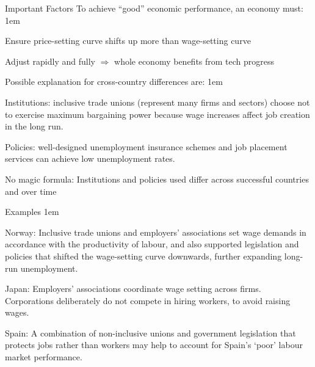 \documentclass[11pt,aspectratio=43,usenames,dvipsnames]{beamer}
\let\oldenumerate=\enumerate
\let\endoldenumerate=\endenumerate
\renewenvironment{enumerate}{\oldenumerate \itemsep1em}{ \endoldenumerate}
\theoremstyle{definition}
\begin{document}
\begin{frame}{Important Factors}
\label{slide:Important_Factors}
    To achieve ``good'' economic performance, an economy must:
    \begin{enumerate}
        \item<1-4> Ensure price-setting curve shifts up more than wage-setting curve
        \item<2-4> Adjust rapidly and fully $ \Rightarrow  $ whole economy benefits from tech progress
    \end{enumerate}

    Possible explanation for cross-country differences are:
    \begin{enumerate}
        \item<3-4>  \alert{Institutions}: inclusive trade unions (represent many firms and sectors) choose not to exercise maximum bargaining power because wage increases affect job creation in the long run.
        \item<4-4> \alert{Policies}: well-designed unemployment insurance schemes and job placement services can achieve low unemployment rates.
    \end{enumerate}

        No magic formula: Institutions and policies used differ across successful countries and over time
\end{frame}

\begin{frame}{Examples}
\label{slide:Examples}
    \begin{enumerate}
        \item<1-3> Norway: Inclusive trade unions and employers’ associations set wage
demands in accordance with the productivity of labour, and also
supported legislation and policies that shifted the wage-setting curve
downwards, further expanding long-run unemployment.
        \item<2-3>
Japan: Employers’ associations coordinate wage setting across firms.
Corporations deliberately do not compete in hiring workers, to avoid
raising wages.
\item<3-3>
Spain: A combination of non-inclusive unions and government
legislation that protects jobs rather than workers may help to account
for Spain’s ‘poor’ labour market performance.
    \end{enumerate}
\end{frame}
\end{document}
